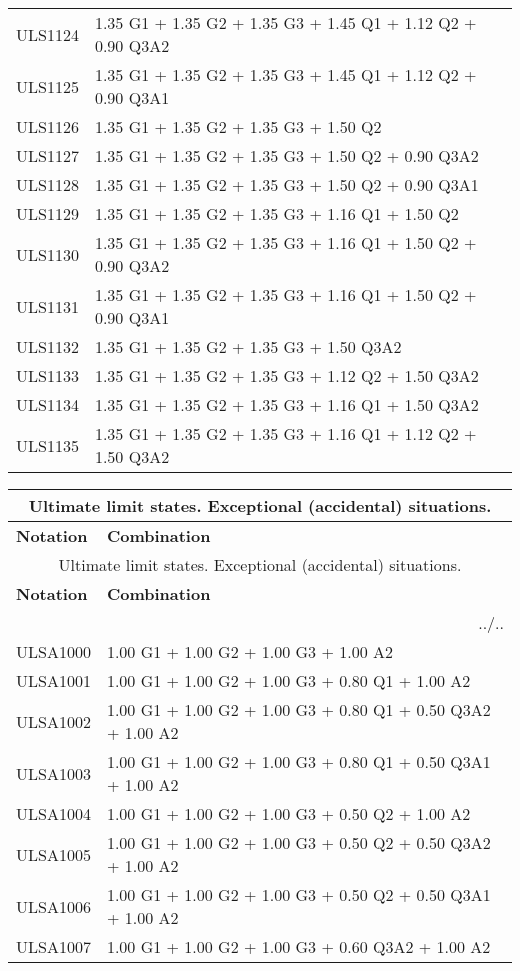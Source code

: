 \begin{center}
\begin{small}
\begin{longtable}{|l|p{10cm}|}
ULS1124 & 1.35 G1 + 1.35 G2 + 1.35 G3 + 1.45 Q1 + 1.12 Q2 + 0.90 Q3A2\\
ULS1125 & 1.35 G1 + 1.35 G2 + 1.35 G3 + 1.45 Q1 + 1.12 Q2 + 0.90 Q3A1\\
ULS1126 & 1.35 G1 + 1.35 G2 + 1.35 G3 + 1.50 Q2\\
ULS1127 & 1.35 G1 + 1.35 G2 + 1.35 G3 + 1.50 Q2 + 0.90 Q3A2\\
ULS1128 & 1.35 G1 + 1.35 G2 + 1.35 G3 + 1.50 Q2 + 0.90 Q3A1\\
ULS1129 & 1.35 G1 + 1.35 G2 + 1.35 G3 + 1.16 Q1 + 1.50 Q2\\
ULS1130 & 1.35 G1 + 1.35 G2 + 1.35 G3 + 1.16 Q1 + 1.50 Q2 + 0.90 Q3A2\\
ULS1131 & 1.35 G1 + 1.35 G2 + 1.35 G3 + 1.16 Q1 + 1.50 Q2 + 0.90 Q3A1\\
ULS1132 & 1.35 G1 + 1.35 G2 + 1.35 G3 + 1.50 Q3A2\\
ULS1133 & 1.35 G1 + 1.35 G2 + 1.35 G3 + 1.12 Q2 + 1.50 Q3A2\\
ULS1134 & 1.35 G1 + 1.35 G2 + 1.35 G3 + 1.16 Q1 + 1.50 Q3A2\\
ULS1135 & 1.35 G1 + 1.35 G2 + 1.35 G3 + 1.16 Q1 + 1.12 Q2 + 1.50 Q3A2\\
\hline
\end{longtable}
\end{small}
\end{center}
\begin{center}
\begin{small}
\begin{longtable}{|l|p{10cm}|}
\hline
\multicolumn{2}{|c|}{Ultimate limit states. Exceptional (accidental) situations.}\\
\hline
\textbf{Notation} & \textbf{Combination} \\
\hline
\endfirsthead
\hline
\multicolumn{2}{|c|}{Ultimate limit states. Exceptional (accidental) situations.}\\
\hline
\textbf{Notation} & \textbf{Combination} \\
\hline
\endhead
\hline \multicolumn{2}{|r|}{{../..}} \\ \hline
\endfoot
\hline
\endlastfoot
ULSA1000 & 1.00 G1 + 1.00 G2 + 1.00 G3 + 1.00 A2\\
ULSA1001 & 1.00 G1 + 1.00 G2 + 1.00 G3 + 0.80 Q1 + 1.00 A2\\
ULSA1002 & 1.00 G1 + 1.00 G2 + 1.00 G3 + 0.80 Q1 + 0.50 Q3A2 + 1.00 A2\\
ULSA1003 & 1.00 G1 + 1.00 G2 + 1.00 G3 + 0.80 Q1 + 0.50 Q3A1 + 1.00 A2\\
ULSA1004 & 1.00 G1 + 1.00 G2 + 1.00 G3 + 0.50 Q2 + 1.00 A2\\
ULSA1005 & 1.00 G1 + 1.00 G2 + 1.00 G3 + 0.50 Q2 + 0.50 Q3A2 + 1.00 A2\\
ULSA1006 & 1.00 G1 + 1.00 G2 + 1.00 G3 + 0.50 Q2 + 0.50 Q3A1 + 1.00 A2\\
ULSA1007 & 1.00 G1 + 1.00 G2 + 1.00 G3 + 0.60 Q3A2 + 1.00 A2\\
\hline
\end{longtable}
\end{small}
\end{center}
